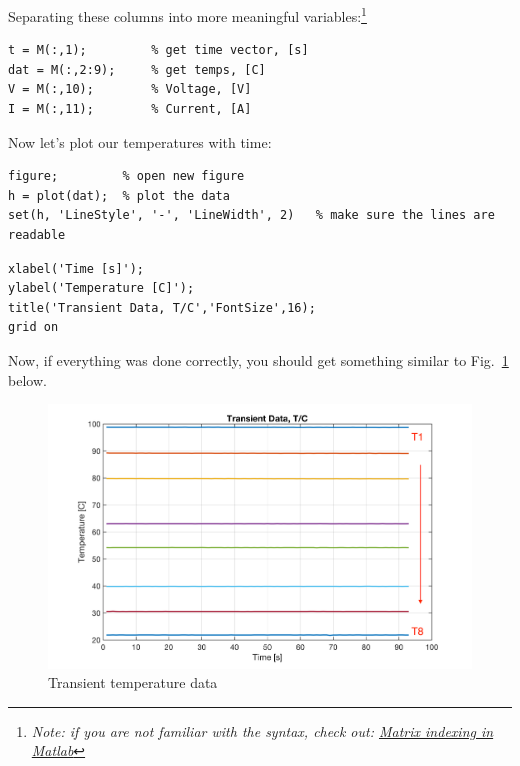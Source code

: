 \documentclass[11pt, letterpaper]{article}
\begin{document}
Separating these columns into more meaningful variables:\footnote{\textit{Note: if you are not familiar with the syntax, check out: \href{https://www.mathworks.com/company/newsletters/articles/matrix-indexing-in-matlab.html}{Matrix indexing in Matlab}  }}
\n
\begin{lstlisting}[numbers=none]
t = M(:,1);         % get time vector, [s]
dat = M(:,2:9);     % get temps, [C]
V = M(:,10);        % Voltage, [V]
I = M(:,11);        % Current, [A]
\end{lstlisting}

\n
Now let's plot our temperatures with time:

\n
\begin{minipage}{\linewidth}
\begin{lstlisting}[numbers=none]
figure;         % open new figure
h = plot(dat);  % plot the data
set(h, 'LineStyle', '-', 'LineWidth', 2)   % make sure the lines are readable
\end{lstlisting}
\end{minipage}

\n
\begin{minipage}{\linewidth}
\begin{lstlisting}[numbers=none]
% don't forget to add labels!!
xlabel('Time [s]');
ylabel('Temperature [C]');
title('Transient Data, T/C','FontSize',16);
grid on
\end{lstlisting}
\end{minipage}

\n
Now, if everything was done correctly, you should get something similar to Fig.~\ref{fig1} below.

\begin{figure}[H]
    \begin{center}
        \includegraphics[width=125mm]{gfx/fig1.png}
    \caption{Transient temperature data}\label{fig1}
    \end{center}
\end{figure}
\end{document}
